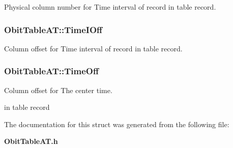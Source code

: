 Physical column number for Time interval of record in table record. 

\subsubsection{ {\bf Obit\-Table\-AT::Time\-IOff}}\label{structObitTableAT_o30}


Column offset for Time interval of record in table record. 

\subsubsection{ {\bf Obit\-Table\-AT::Time\-Off}}\label{structObitTableAT_o28}


Column offset for The center time. 

in table record 

The documentation for this struct was generated from the following file:\begin{CompactItemize}
\item 
{\bf Obit\-Table\-AT.h}\end{CompactItemize}
